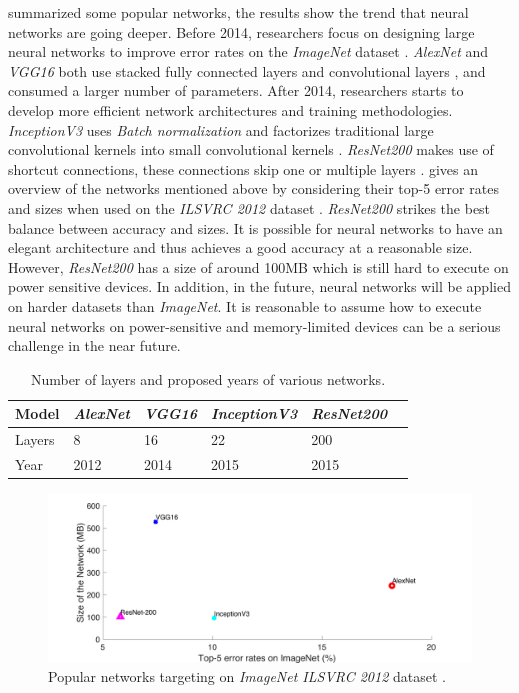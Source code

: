\documentclass[a4paper,12pt]{report}
\begin{document}
 summarized some popular networks, the results show the
trend that neural networks are going deeper.
Before 2014, researchers focus on designing large neural networks to improve
error rates on the \textit{ImageNet} dataset \cite{deng2009imagenet}.
\textit{AlexNet} and \textit{VGG16} both use stacked fully connected layers and
convolutional layers \cite{Krizhevsky, DBLP:journals/corr/SimonyanZ14a}, and
consumed a larger number of parameters.
After 2014, researchers starts to develop more efficient network
architectures and training methodologies.
\textit{InceptionV3} uses \textit{Batch normalization} \cite{DBLP:journals/corr/IoffeS15}
and factorizes traditional large convolutional kernels into small convolutional kernels \cite{DBLP:journals/corr/SzegedyVISW15}.
\textit{ResNet200} makes use of shortcut connections, these connections skip one
or multiple layers \cite{DBLP:journals/corr/HeZRS15}.
 gives an overview of the networks mentioned above by considering
their top-5 error rates and sizes when used on the \textit{ILSVRC 2012} dataset \cite{deng2009imagenet}.
\textit{ResNet200} strikes the best balance between accuracy and sizes.
It is possible for neural networks to have an elegant architecture and thus
achieves a good accuracy at a reasonable size.
However, \textit{ResNet200} has a size of around 100MB which is still hard
to execute on power sensitive devices.
In addition, in the future, neural networks will be applied on harder datasets
than \textit{ImageNet}.
It is reasonable to assume how to execute neural networks
on power-sensitive and memory-limited devices can be a serious challenge in the
near future.


\begin{table}[!h]
\centering
\begin{tabular}{|l|l|l|l|l|l|}
\hline
Model   &\textit{AlexNet} 	&\textit{VGG16}	&\textit{InceptionV3}	 &\textit{ResNet200}\\ \hline
Layers  &8	     &16 &22  &200\\
\hline
Year    &2012	&2014	   &2015&2015 \\
\hline
\end{tabular}
\caption{\label{tab:networkmodels}Number of layers and proposed years of various
networks.}
\end{table}

\begin{figure}[!h]
  \includegraphics[width=\textwidth]{fig_network_size}
  \caption{Popular networks targeting on \textit{ImageNet ILSVRC 2012} dataset \cite{deng2009imagenet}.}
  \label{fig:network_size}
\end{figure}
\end{document}
